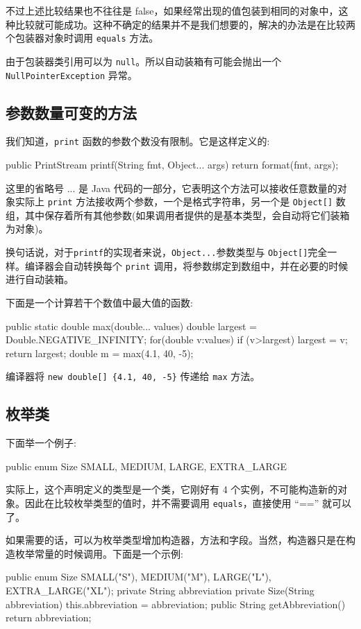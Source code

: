 不过上述比较结果也不往往是 false，如果经常出现的值包装到相同的对象中，这种比较就可能成功。这种不确定的结果并不是我们想要的，解决的办法是在比较两个包装器对象时调用 \texttt{equals} 方法。

由于包装器类引用可以为 \texttt{null}。所以自动装箱有可能会抛出一个 \texttt{NullPointerException} 异常。

\subsection{参数数量可变的方法}

我们知道，\texttt{print} 函数的参数个数没有限制。它是这样定义的:
\begin{Java}
public PrintStream printf(String fmt, Object... args) {
    return format(fmt, args);
}
\end{Java}

这里的省略号 ... 是 Java 代码的一部分，它表明这个方法可以接收任意数量的对象实际上 \texttt{print} 方法接收两个参数，一个是格式字符串，另一个是 \texttt{Object[]} 数组，其中保存着所有其他参数(如果调用者提供的是基本类型，会自动将它们装箱为对象)。

换句话说，对于\texttt{printf}的实现者来说，\texttt{Object...}参数类型与 \texttt{Object[]}完全一样。编译器会自动转换每个 \texttt{print} 调用，将参数绑定到数组中，并在必要的时候进行自动装箱。

下面是一个计算若干个数值中最大值的函数:
\begin{Java}
public static double max(double... values) {
    double largest = Double.NEGATIVE_INFINITY;
    for(double v:values)
        if (v>largest)
            largest = v;
    return largest;
}
double m = max(4.1, 40, -5);
\end{Java}

编译器将 \texttt{new double[] \{4.1, 40, -5\}} 传递给 \texttt{max} 方法。

\subsection{枚举类}

下面举一个例子:
\begin{Java}
public enum Size {SMALL, MEDIUM, LARGE, EXTRA_LARGE}
\end{Java}
实际上，这个声明定义的类型是一个类，它刚好有 4 个实例，不可能构造新的对象。因此在比较枚举类型的值时，并不需要调用 \texttt{equals}，直接使用 ``=='' 就可以了。

如果需要的话，可以为枚举类型增加构造器，方法和字段。当然，构造器只是在构造枚举常量的时候调用。下面是一个示例:
\begin{Java}
public enum Size {
    SMALL("S"), MEDIUM("M"), LARGE("L"), EXTRA_LARGE("XL");
    private String abbreviation
    private Size(String abbreviation) {this.abbreviation = abbreviation;}
    public String getAbbreviation() {return abbreviation;}
}
\end{Java}

